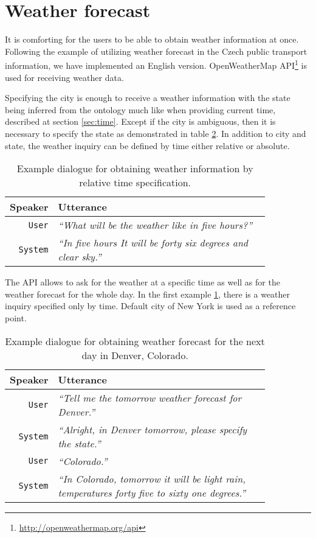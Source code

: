 \section{Weather forecast}

It is comforting for the users to be able to obtain weather information at once.
Following the example of utilizing weather forecast in the Czech public transport information, we have implemented an English version.
OpenWeatherMap \ac{API}\footnote{\url{http://openweathermap.org/api}} is used for receiving weather data.

Specifying the city is enough to receive a weather information with the state being inferred from the ontology much like when providing current time, described at section \ref{sec:time}.
Except if the city is ambiguous, then it is necessary to specify the state as demonstrated in table \ref{table:forecast}.
In addition to city and state, the weather inquiry can be defined by time either relative or absolute.

\begin{table}[h]
\centering
\begin{tabular}{ | r | p{0.85\linewidth} | } \hline
	\textbf{Speaker} & \textbf{Utterance} \\ \hline
	\texttt{User} & \textit{``What will be the weather like in five hours?''} \\ \hline
	\texttt{System} & \textit{``In five hours It will be forty six degrees and clear sky.''} \\ \hline
\end{tabular}
\caption[Weather inquiry by relative time]{Example dialogue for obtaining weather information by relative time specification.}
\label{table:weather}
\end{table}

The \ac{API} allows to ask for the weather at a specific time as well as for the weather forecast for the whole day.
In the first example \ref{table:weather}, there is a weather inquiry specified only by time.
Default city of New York is used as a reference point.

\begin{table}[h]
\centering
\begin{tabular}{ | r | p{0.85\linewidth} | } \hline
	\textbf{Speaker} & \textbf{Utterance} \\ \hline
	\texttt{User} & \textit{``Tell me the tomorrow weather forecast for Denver.''} \\ \hline
	\texttt{System} & \textit{``Alright, in Denver tomorrow, please specify the state.''} \\ \hline
	\texttt{User} & \textit{``Colorado.''} \\ \hline
	\texttt{System} & \textit{``In Colorado, tomorrow it will be light rain, temperatures forty five to sixty one degrees.''} \\ \hline
\end{tabular}
\caption[Weather forecast for the next day in Denver, Colorado]{Example dialogue for obtaining weather forecast for the next day in Denver, Colorado.}
\label{table:forecast}
\end{table}

